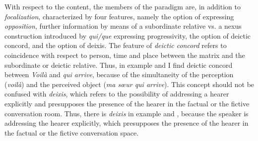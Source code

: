 \documentclass[output=paper]{langsci/langscibook}
\begin{document}
With respect to the content, the members of the paradigm are, in addition to \textit{focalization}, characterized by four features, namely the option of expressing \textit{opposition}, further information by means of a subordinate relative vs. a nexus construction introduced by \textit{qui/que} expressing progressivity, the option of deictic concord, and the option of deixis. The feature of \textit{deictic concord} refers to coincidence with respect to person, time and place between the matrix and the subordinate or deictic relative. Thus, in example  and  I find deictic concord between \textit{Voilà} and \textit{qui arrive}, because of the simultaneity of the perception (\textit{voilà}) and the perceived object (\textit{ma sœur qui arrive}). This concept should not be confused with \textit{deixis}, which refers to the possibility of addressing a hearer explicitly and presupposes the presence of the hearer in the factual or the fictive conversation room. Thus, there is \textit{deixis} in example  and , because the speaker is addressing the hearer explicitly, which presupposes the presence of the hearer in the factual or the fictive conversation space. 
\end{document}
